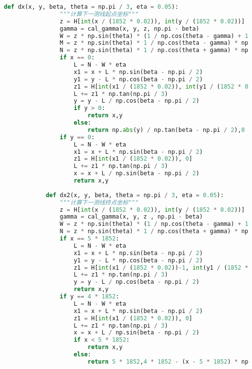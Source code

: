 \documentclass[withoutpreface,bwprint]{cumcmthesis} %
\begin{document}
\begin{appendices}
\begin{lstlisting}[language=python]
            def dx(x, y, beta, theta = np.pi / 3, eta = 0.05):
                """计算下一测线起点坐标"""
                z = H[int(x / (1852 * 0.02)), int(y / (1852 * 0.02))]
                gamma = cal_gamma(x, y, z, np.pi - beta)
                W = z * np.sin(theta) * (1 / np.cos(theta - gamma) + 1 / np.cos(theta + gamma)) * np.cos(gamma)
                M = z * np.sin(theta) * 1 / np.cos(theta - gamma) * np.cos(gamma)   
                N = z * np.sin(theta) * 1 / np.cos(theta + gamma) * np.cos(gamma)
                if x == 0:
                    L = N - W * eta
                    x1 = x + L * np.sin(beta - np.pi / 2)
                    y1 = y - L * np.cos(beta - np.pi / 2)
                    z1 = H[int(x1 / (1852 * 0.02)), int(y1 / (1852 * 0.02))]
                    L += z1 * np.tan(np.pi / 3)
                    y = y - L / np.cos(beta - np.pi / 2)
                    if y > 0:
                        return x,y
                    else:
                        return np.abs(y) / np.tan(beta - np.pi / 2),0
                if y == 0:
                    L = N - W * eta
                    x1 = x + L * np.sin(beta - np.pi / 2)
                    z1 = H[int(x1 / (1852 * 0.02)), 0]
                    L += z1 * np.tan(np.pi / 3)
                    x = x + L / np.sin(beta - np.pi / 2)
                    return x,y
            
            def dx2(x, y, beta, theta = np.pi / 3, eta = 0.05):
                """计算下一测线终点坐标"""
                z = H[int(x / (1852 * 0.02)), int(y / (1852 * 0.02))]
                gamma = cal_gamma(x, y, z , np.pi - beta)
                W = z * np.sin(theta) * (1 / np.cos(theta - gamma) + 1 / np.cos(theta + gamma)) * np.cos(gamma)
                N = z * np.sin(theta) * 1 / np.cos(theta + gamma) * np.cos(gamma)
                if x == 5 * 1852:
                    L = N - W * eta
                    x1 = x + L * np.sin(beta - np.pi / 2)
                    y1 = y - L * np.cos(beta - np.pi / 2)
                    z1 = H[int(x1 / (1852 * 0.02))-1, int(y1 / (1852 * 0.02))]
                    L += z1 * np.tan(np.pi / 3)
                    y = y - L / np.cos(beta - np.pi / 2)
                    return x,y
                if y == 4 * 1852:
                    L = N - W * eta
                    x1 = x + L * np.sin(beta - np.pi / 2)
                    z1 = H[int(x1 / (1852 * 0.02)), 0]
                    L += z1 * np.tan(np.pi / 3)
                    x = x + L / np.sin(beta - np.pi / 2)
                    if x < 5 * 1852:
                        return x,y
                    else:
                        return 5 * 1852,4 * 1852 - (x - 5 * 1852) * np.tan(beta - np.pi / 2)
                    

\end{lstlisting}
\end{appendices}
\end{document}
